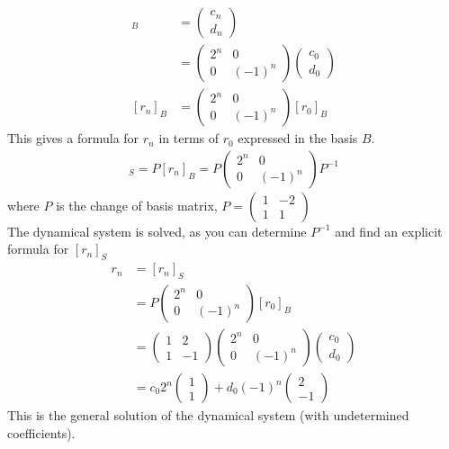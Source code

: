 \documentclass[letterpaper,12pt]{article}
\begin{document}
\begin{align*}
    [r_n]_{B} & = \begin{pmatrix} c_n \\ d_n \end{pmatrix} \\
    & = \begin{pmatrix} 2^n & 0 \\ 0 & (-1)^n \end{pmatrix} \begin{pmatrix} c_0 \\ d_0 \end{pmatrix} \\
    [r_n]_{B} & = \begin{pmatrix} 2^n & 0 \\ 0 & (-1)^n \end{pmatrix} [r_0]_{B}
\end{align*}
This gives a formula for $r_n$ in terms of $r_0$ expressed in the basis $B$.
\begin{align*}
    [r_n]_{S} = P [r_n]_{B} = P \begin{pmatrix} 2^n & 0 \\ 0 & (-1)^n \end{pmatrix} P^{-1}
\end{align*}
where $P$ is the change of basis matrix, $P = \begin{pmatrix} 1 & -2 \\ 1 & 1 \end{pmatrix}$
\\ The dynamical system is solved, as you can determine $P^{-1}$ and find an explicit formula for $[r_n]_{S}$
\begin{align*}
    r_n & = [r_n]_{S} \\
    & = P \begin{pmatrix} 2^n & 0 \\ 0 & (-1)^n \end{pmatrix} [r_0]_{B} \\
    & = \begin{pmatrix} 1 & 2 \\ 1 & -1 \end{pmatrix} \begin{pmatrix} 2^n & 0 \\ 0 & (-1)^n \end{pmatrix} \begin{pmatrix} c_0 \\ d_0 \end{pmatrix} \\
    & = c_0 2^n \begin{pmatrix} 1 \\ 1 \end{pmatrix} + d_0 (-1)^n \begin{pmatrix} 2 \\ -1 \end{pmatrix}
\end{align*}
This is the general solution of the dynamical system (with undetermined coefficients).
\end{document}
